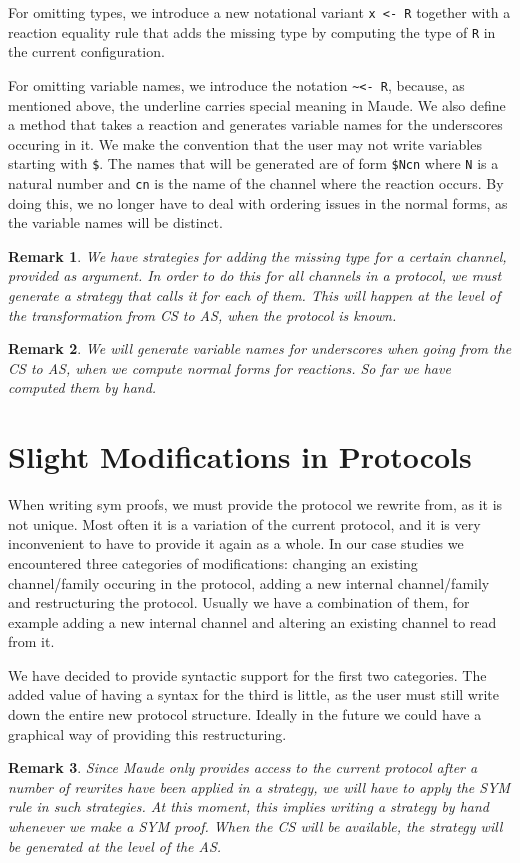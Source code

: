 \documentclass{article}
\newtheorem{remark}{Remark}
\begin{document}
For omitting types, we introduce a new notational variant \verb+x <- R+ 
together with a reaction equality rule that adds the missing type by 
computing the type of \verb+R+ in the current configuration. 

For omitting variable names, we introduce the notation \verb+~<- R+,
because, as mentioned above, the underline carries special meaning in Maude. We also define a method that takes a reaction and generates variable names for the underscores occuring in it. We make the convention that the user may not write variables starting with \verb+$+. The names that will be generated are of form \verb+$Ncn+ where \verb+N+ is a natural number and 
\verb+cn+ is the name of the channel where the reaction occurs. By doing this, we no longer have to deal with ordering issues in the normal forms, as the variable names will be distinct. 

\begin{remark}
We have strategies for adding the missing type for a certain channel, 
provided as argument. In order to do this for all channels in a protocol,
we must generate a strategy that calls it for each of them. This will
happen at the level of the transformation from CS to AS, when the protocol
is known.
\end{remark}

\begin{remark} 
We will generate variable names for underscores when going from the CS to AS, when we compute normal forms for reactions. So far we have computed them by hand.
\end{remark}

\section{Slight Modifications in Protocols}

When writing sym proofs, we must provide the protocol we rewrite from, as it is not unique. Most often it is a variation of the current protocol, and 
it is very inconvenient to have to provide it again as a whole. In our case studies we encountered three categories of modifications: changing an existing channel/family occuring in the protocol, adding a new internal
channel/family and restructuring the protocol. Usually we have a combination of them, for example adding a new internal channel and altering an existing channel to read from it. 

We have decided to provide syntactic support for the first two categories. 
The added value of having a syntax for the third is little, as the user must still write down the entire new protocol structure. Ideally in the 
future we could have a graphical way of providing this restructuring.

\begin{remark}
Since Maude only provides access to the current protocol after a number
of rewrites have been applied in a strategy, we will have to apply the SYM rule in such strategies. At this moment, this implies writing a strategy
by hand whenever we make a SYM proof. When the CS will be available,
the strategy will be generated at the level of the AS.
\end{remark}
\end{document}
